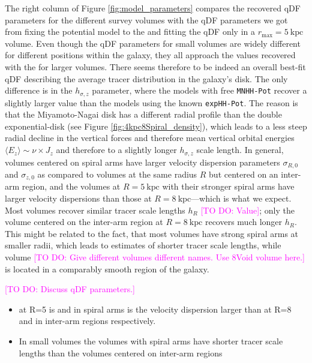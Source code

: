 \documentclass[iop,revtex4,numberedappendix,appendixfloats]{emulateapj}
\newcommand{\Wilma}[1]{\textcolor{Magenta}{#1}}
\begin{document}
The right column of Figure \ref{fig:model_parameters} compares the recovered qDF parameters for the different survey volumes with the qDF parameters we got from fixing the potential model to the  and fitting the qDF only in a $r_\text{max}=5~\text{kpc}$ volume. Even though the qDF parameters for small volumes are widely different for different positions within the galaxy, they all approach the values recovered with the  for larger volumes. There seems therefore to be indeed an overall best-fit qDF describing the average tracer distribution in the galaxy's disk. The only difference is in the $h_{\sigma,z}$ parameter, where the models with free \texttt{MNHH-Pot} recover a slightly larger value than the models using the known \texttt{expHH-Pot}. The reason is that the Miyamoto-Nagai disk has a different radial profile than the double exponential-disk (see Figure \ref{fig:4kpc8Spiral_density}), which leads to a less steep radial decline in the vertical forces and therefore mean vertical orbital energies $\langle E_z \rangle \sim \nu \times J_z$ and therefore to a slightly longer $h_{\sigma,z}$ scale length. In general, volumes centered on spiral arms have larger velocity dispersion parameters $\sigma_{R,0}$ and $\sigma_{z,0}$ as compared to volumes at the same radius $R$ but centered on an inter-arm region, and the volumes at $R=5~\text{kpc}$ with their stronger spiral arms have larger velocity dispersions than those at $R=8~\text{kpc}$---which is what we expect. Most volumes recover similar tracer scale lengths $h_R$ \Wilma{[TO DO: Value]}; only the volume centered on the inter-arm region at $R=8~\text{kpc}$ recovers much longer $h_R$. This might be related to the fact, that most volumes have strong spiral arms at smaller radii, which leads to estimates of shorter tracer scale lengths, while volume \Wilma{[TO DO: Give different volumes different names. Use 8Void volume here.]} is located in a comparably smooth region of the galaxy.

\Wilma{[TO DO: Discuss qDF parameters.]}
\begin{itemize}
\item at R=5 is and in spiral arms is the velocity dispersion larger than at R=8 and in inter-arm regions respectively.
\item In small volumes the volumes with spiral arms have shorter tracer scale lengths than the volumes centered on inter-arm regions
\end{itemize}
\end{document}

